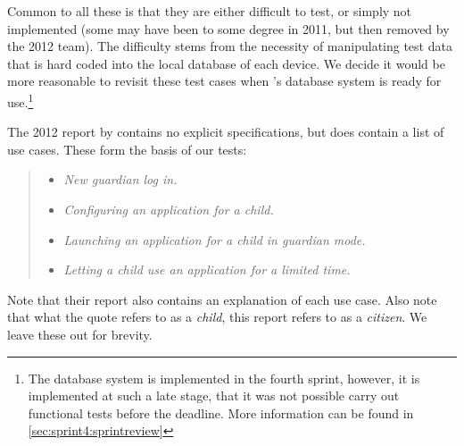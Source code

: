 Common to all these is that they are either difficult to test, or simply not implemented (some may have been to some degree in 2011, but then removed by the 2012 team).
The difficulty stems from the necessity of manipulating test data that is hard coded into the local database of each device. 
We decide it would be more reasonable to revisit these test cases when \giraf's database system is ready for use.\footnote{The database system is implemented in the fourth sprint, however, it is implemented at such a late stage, that it was not possible carry out functional tests before the deadline. More information can be found in \cref{sec:sprint4:sprintreview}}

The 2012 report by \citet{launcher2012} contains no explicit specifications, but does contain a list of use cases. 
These form the basis of our tests:

\begin{quote}
\begin{itemize}
	\item \textit{New guardian log in.}
	\item \textit{Configuring an application for a child.}
	\item \textit{Launching an application for a child in guardian mode.}
	\item \textit{Letting a child use an application for a limited time.}
\end{itemize}
\end{quote}

Note that their report also contains an explanation of each use case. Also note that what the quote refers to as a \textit{child}, this report refers to as a \textit{citizen}.
We leave these out for brevity.